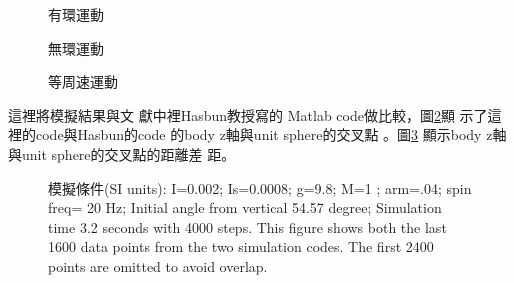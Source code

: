 \documentclass[12pt,a4paper]{article}
\begin{document}
\begin{figure}[th]
\caption{有環運動}
\begin{center}
\end{center}
\end{figure}

\begin{figure}[th]
\caption{無環運動}
\begin{center}
\end{center}
\end{figure}

\begin{figure}[th]
\caption{等周速運動}
\label{figure_uniform}
\begin{center}
\end{center}
\end{figure}

這裡將模擬結果與文%
獻中\cite{hasbun}裡Hasbun教授寫的%
Matlab code做比較，圖\ref{compare}顯%
示了這裡的code與Hasbun的code%
的body z軸與unit sphere的交叉點%
。圖\ref{compare2} 顯示body z軸與unit
sphere的交叉點的距離差%
距。
\begin{figure}[th]
\caption{{}模擬條件(SI units): I=0.002; Is=0.0008;
g=9.8; M=1 ; arm=.04; spin freq= 20 Hz; Initial angle from vertical 54.57
degree; Simulation time 3.2 seconds with 4000 steps. This figure shows both
the last 1600 data points from the two simulation codes. The first 2400
points are omitted to avoid overlap.}
\begin{center}
\end{center}
\label{compare}
\end{figure}
\begin{figure}[th]
\caption{{}}
\begin{center}
\end{center}
\label{compare2}
\end{figure}
\end{document}
